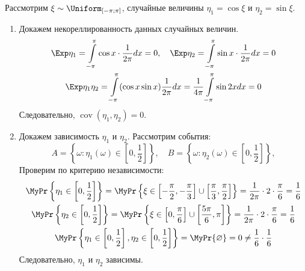 \hypertarget{counter_exmp_independence}{}
\begin{exmp}
    Рассмотрим $\xi \sim \Uniform_{[-\pi;\pi]}$, случайные величины ${\eta_{1}=\cos \xi}$ и ${\eta_{2}=\sin \xi}$.
    \begin{enumerate}
        \item 
            Докажем некореллированность данных случайных величин.
            \begin{gather*}
                \Exp \eta_{1}=\int\limits_{-\pi}^{\pi} \cos x \cdot \frac{1}{2 \pi} d x=0, \quad \Exp \eta_{2}=\int\limits_{-\pi}^{\pi} \sin x \cdot \frac{1}{2 \pi} d x=0 \\
                \Exp \eta_{1} \eta_{2}=\int\limits_{-\pi}^{\pi}(\cos x \sin x) \frac{1}{2 \pi} d x=\frac{1}{4 \pi} \int\limits_{-\pi}^{\pi} \sin 2 x d x=0
            \end{gather*}
            Следовательно, $\operatorname{cov}(\eta_1, \eta_2) = 0$.
        \item 
            Докажем зависимость $\eta_1$ и $\eta_2$. Рассмотрим события:
            \begin{equation*}
                A = \left\{\omega \colon \eta_1(\omega) \in \left[0, \frac{1}{2} \right] \right\}, \quad
                B = \left\{\omega \colon \eta_2(\omega) \in \left[0, \frac{1}{2} \right] \right\},
            \end{equation*}
            Проверим по критерию независимости:
            \begin{gather*}
                \MyPr\left\{\eta_{1} \in\left[0, \frac{1}{2}\right]\right\}=\MyPr\left\{\xi \in\left[-\frac{\pi}{2},-\frac{\pi}{3}\right] \cup\left[\frac{\pi}{3}, \frac{\pi}{2}\right]\right\}=\frac{1}{2 \pi} \cdot 2 \cdot \frac{\pi}{6}=\frac{1}{6} \\
                \MyPr\left\{\eta_{2} \in\left[0, \frac{1}{2}\right]\right\}=\MyPr\left\{\xi \in\left[0, \frac{\pi}{6}\right] \cup\left[\frac{5 \pi}{6}, \pi\right]\right\}=\frac{1}{2 \pi} \cdot 2 \cdot \frac{\pi}{6}=\frac{1}{6} \\
                \MyPr\left\{\eta_{1} \in\left[0, \frac{1}{2}\right], \eta_{2} \in\left[0, \frac{1}{2}\right]\right\}=\MyPr\{\varnothing\}=0 \neq \frac{1}{6} \cdot \frac{1}{6}
            \end{gather*}
            Следовательно, $\eta_1$ и $\eta_2$ зависимы.
    \end{enumerate}
\end{exmp}

